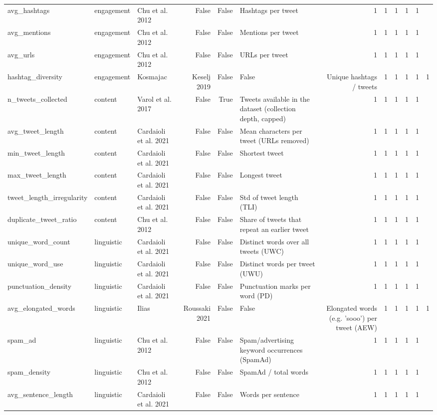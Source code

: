 \begin{tabular}{lllrrlrrrrr}
avg_hashtags & engagement & Chu et al. 2012 & False & False & Hashtags per tweet & 1 & 1 & 1 & 1 & 1 \\
avg_mentions & engagement & Chu et al. 2012 & False & False & Mentions per tweet & 1 & 1 & 1 & 1 & 1 \\
avg_urls & engagement & Chu et al. 2012 & False & False & URLs per tweet & 1 & 1 & 1 & 1 & 1 \\
hashtag_diversity & engagement & Kosmajac & Keselj 2019 & False & False & Unique hashtags / tweets & 1 & 1 & 1 & 1 & 1 \\
n_tweets_collected & content & Varol et al. 2017 & False & True & Tweets available in the dataset (collection depth, capped) & 1 & 1 & 1 & 1 & 1 \\
avg_tweet_length & content & Cardaioli et al. 2021 & False & False & Mean characters per tweet (URLs removed) & 1 & 1 & 1 & 1 & 1 \\
min_tweet_length & content & Cardaioli et al. 2021 & False & False & Shortest tweet & 1 & 1 & 1 & 1 & 1 \\
max_tweet_length & content & Cardaioli et al. 2021 & False & False & Longest tweet & 1 & 1 & 1 & 1 & 1 \\
tweet_length_irregularity & content & Cardaioli et al. 2021 & False & False & Std of tweet length (TLI) & 1 & 1 & 1 & 1 & 1 \\
duplicate_tweet_ratio & content & Chu et al. 2012 & False & False & Share of tweets that repeat an earlier tweet & 1 & 1 & 1 & 1 & 1 \\
unique_word_count & linguistic & Cardaioli et al. 2021 & False & False & Distinct words over all tweets (UWC) & 1 & 1 & 1 & 1 & 1 \\
unique_word_use & linguistic & Cardaioli et al. 2021 & False & False & Distinct words per tweet (UWU) & 1 & 1 & 1 & 1 & 1 \\
punctuation_density & linguistic & Cardaioli et al. 2021 & False & False & Punctuation marks per word (PD) & 1 & 1 & 1 & 1 & 1 \\
avg_elongated_words & linguistic & Ilias & Roussaki 2021 & False & False & Elongated words (e.g. 'sooo') per tweet (AEW) & 1 & 1 & 1 & 1 & 1 \\
spam_ad & linguistic & Chu et al. 2012 & False & False & Spam/advertising keyword occurrences (SpamAd) & 1 & 1 & 1 & 1 & 1 \\
spam_density & linguistic & Chu et al. 2012 & False & False & SpamAd / total words & 1 & 1 & 1 & 1 & 1 \\
avg_sentence_length & linguistic & Cardaioli et al. 2021 & False & False & Words per sentence & 1 & 1 & 1 & 1 & 1 \\

\end{tabular}
